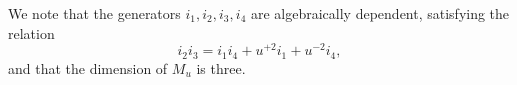 \documentclass[a4paper,reqno]{amsart}
\numberwithin{equation}{section}
\numberwithin{equation}{section}
\begin{document}
We note that the generators $i_1,i_2,i_3,i_4$ are algebraically dependent, satisfying the relation
\begin{equation*}
    i_2 i_3 = i_1 i_4 + u^{+2} i_1 + u^{-2} i_4,
\end{equation*}
and that the dimension of $M_u$ is three.
\end{document}
